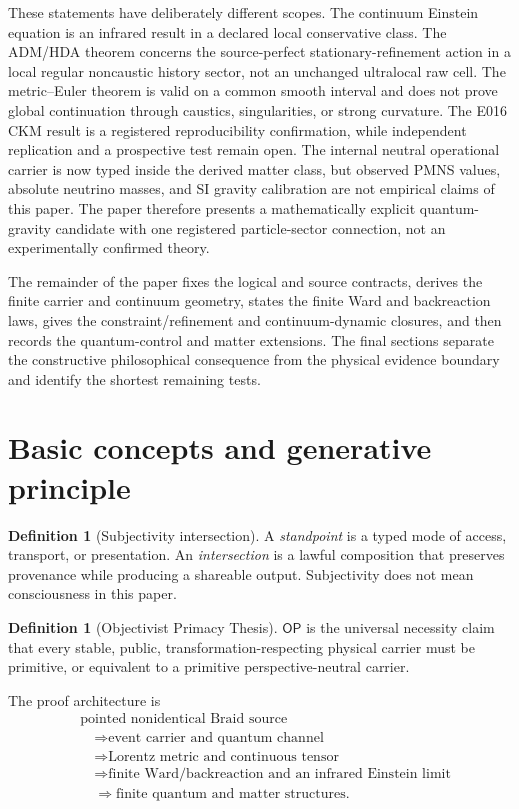 \documentclass[11pt]{article}
\theoremstyle{definition}
\newtheorem{definition}[theorem]{Definition}
\theoremstyle{remark}
\newcommand{\OPT}{\mathsf{OP}}
\begin{document}
These statements have deliberately different scopes. The continuum Einstein
equation is an infrared result in a declared local conservative class. The
ADM/HDA theorem concerns the source-perfect stationary-refinement action in a
local regular noncaustic history sector, not an unchanged ultralocal raw cell.
The metric--Euler theorem is valid on a common smooth interval and does not
prove global continuation through caustics, singularities, or strong
curvature. The E016 CKM result is a registered reproducibility confirmation,
while independent replication and a prospective test remain open.
The internal neutral operational carrier is now typed inside the derived
matter class, but observed PMNS values, absolute neutrino masses, and SI
gravity calibration are not empirical claims of this paper. The paper therefore presents a
mathematically explicit quantum-gravity candidate with one registered
particle-sector connection, not an experimentally confirmed theory.

The remainder of the paper fixes the logical and source contracts, derives the
finite carrier and continuum geometry, states the finite Ward and
backreaction laws, gives the constraint/refinement and continuum-dynamic
closures, and then records the quantum-control and matter extensions. The
final sections separate the constructive philosophical consequence from the
physical evidence boundary and identify the shortest remaining tests.

\section{Basic concepts and generative principle}

\begin{definition}[Subjectivity intersection]
A \emph{standpoint} is a typed mode of access, transport, or presentation. An \emph{intersection} is a lawful composition that preserves provenance while producing a shareable output. Subjectivity does not mean consciousness in this paper.
\end{definition}

\begin{definition}[Objectivist Primacy Thesis]
$\OPT$ is the universal necessity claim that every stable, public, transformation-respecting physical carrier must be primitive, or equivalent to a primitive perspective-neutral carrier.
\end{definition}

The proof architecture is
\begin{equation}
\begin{aligned}
&\text{pointed nonidentical Braid source}\\
&\quad\Longrightarrow\text{event carrier and quantum channel}\\
&\quad\Longrightarrow\text{Lorentz metric and continuous tensor}\\
&\quad\Longrightarrow\text{finite Ward/backreaction and an infrared Einstein limit}\\
&\quad\Longrightarrow\text{finite quantum and matter structures}.
\end{aligned}
\label{eq:architecture}
\end{equation}
\end{document}
